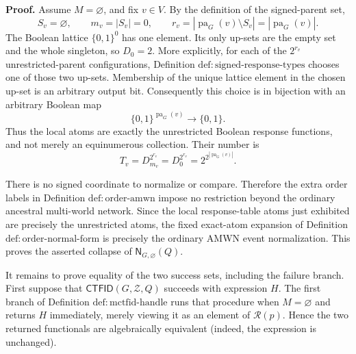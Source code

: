 \textbf{Proof.}
Assume \(M=\varnothing\), and fix \(v\in V\).  By the definition of the signed-parent set,
\[
 S_v=\varnothing,
 \qquad
 m_v=|S_v|=0,
 \qquad
 r_v=|\operatorname{pa}_G(v)\setminus S_v|
     =|\operatorname{pa}_G(v)|.
\]
The Boolean lattice \(\{0,1\}^{0}\) has one element.  Its only up-sets are the empty set and the whole singleton, so \(D_0=2\).  More explicitly, for each of the \(2^{r_v}\) unrestricted-parent configurations, Definition \(\mathrm{def:signed\text{-}response\text{-}types}\) chooses one of those two up-sets.  Membership of the unique lattice element in the chosen up-set is an arbitrary output bit.  Consequently this choice is in bijection with an arbitrary Boolean map
\[
 \{0,1\}^{\operatorname{pa}_G(v)}\longrightarrow\{0,1\}.
\]
Thus the local atoms are exactly the unrestricted Boolean response functions, and not merely an equinumerous collection.  Their number is
\[
 T_v=D_{m_v}^{2^{r_v}}
     =D_0^{2^{r_v}}
     =2^{2^{|\operatorname{pa}_G(v)|}}.
\]

There is no signed coordinate to normalize or compare.  Therefore the extra order labels in Definition \(\mathrm{def:order\text{-}amwn}\) impose no restriction beyond the ordinary ancestral multi-world network.  Since the local response-table atoms just exhibited are precisely the unrestricted atoms, the fixed exact-atom expansion of Definition \(\mathrm{def:order\text{-}normal\text{-}form}\) is precisely the ordinary AMWN event normalization.  This proves the asserted collapse of \(\mathsf N_{G,\varnothing}(Q)\).

It remains to prove equality of the two success sets, including the failure branch.  First suppose that \(\mathsf{CTFID}(G,\mathcal Z,Q)\) succeeds with expression \(H\).  The first branch of Definition \(\mathrm{def:mctfid\text{-}handle}\) runs that procedure when \(M=\varnothing\) and returns \(H\) immediately, merely viewing it as an element of \(\mathcal R(p)\).  Hence the two returned functionals are algebraically equivalent (indeed, the expression is unchanged).

